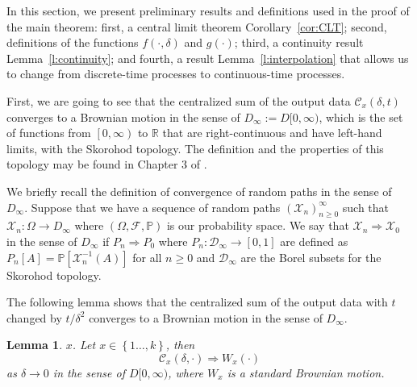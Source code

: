 \documentclass{wscpaperproc}
\theoremstyle{wsc}
\newtheorem{lemma}{Lemma}
\begin{document}
In this section, we present preliminary results and definitions used in the proof of the main theorem: first, a central limit theorem Corollary~\ref{cor:CLT}; second, definitions of the functions $f(\cdot,\delta)$ and $g(\cdot)$; third, a continuity result Lemma~\ref{l:continuity}; and fourth, a result Lemma~\ref{l:interpolation} that allows us to change from discrete-time processes to continuous-time processes.

First, we are going to see that the centralized sum of the output
data $\mathcal{C}_x(\delta,t)$ converges to a Brownian motion in the sense of $D_{\infty}:=D[0,\infty)$,
which is the set of functions from $\left[0,\infty\right)$ to $\mathbb{R}$
that are right-continuous and have left-hand limits, with the Skorohod
topology. The definition and the properties of this topology may be
found in Chapter 3 of . 

We briefly recall the definition of convergence of random paths in
the sense of $D_{\infty}$. Suppose that we have a sequence of random
paths $\left(\mathcal{X}_{n}\right)_{n\geq0}^{\infty}$ such that
$\mathcal{X}_{n}:\varOmega\rightarrow D_{\infty}$ where $\left(\Omega,\mathcal{F},\mathbb{P}\right)$
is our probability space. We say that $\mathcal{X}_{n}\Rightarrow\mathcal{X}_{0}$
in the sense of $D_{\infty}$ if $P_{n}\Rightarrow P_{0}$ where $P_{n}:\mathcal{D}_{\infty}\rightarrow\left[0,1\right]$
are defined as $P_{n}\left[A\right]=\mathbb{P}\left[\mathcal{X}_{n}^{-1}\left(A\right)\right]$
for all $n\geq0$ and $\mathcal{D}_{\infty}$ are the Borel subsets
for the Skorohod topology.

The following lemma shows that the centralized sum of the output
data with $t$ changed by $t/\delta^{2}$ converges to a Brownian
motion in the sense of $D_{\infty}$. 

\begin{lemma}
$x$. 
Let $x\in\left\{ 1\ldots,k\right\} $, then
\[
\mathcal{C}_{x}\left(\delta,\cdot\right)\Rightarrow W_{x}\left(\cdot\right)
\]
as $\delta\rightarrow0$ in the sense of $D[0,\infty)$, where $W_{x}$
is a standard Brownian motion.
\end{lemma}
\end{document}
